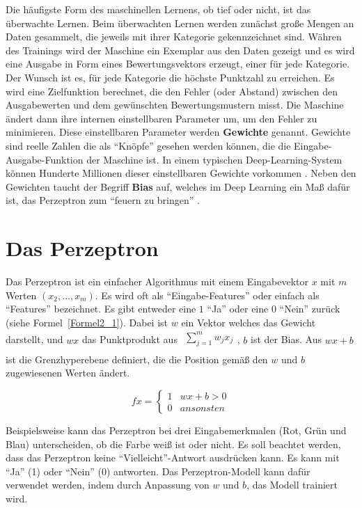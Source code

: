 Die häufigste Form des maschinellen Lernens, ob tief oder nicht, ist das überwachte Lernen. Beim überwachten Lernen werden zunächst große Mengen an Daten gesammelt, die jeweils mit ihrer Kategorie gekennzeichnet sind. Währen des Trainings wird der Maschine ein Exemplar aus den Daten gezeigt und es wird eine Ausgabe in Form eines Bewertungsvektors erzeugt, einer für jede Kategorie. Der Wunsch ist es, für jede Kategorie die höchste Punktzahl zu erreichen. Es wird eine Zielfunktion berechnet, die den Fehler (oder Abstand) zwischen den Ausgabewerten und dem gewünschten Bewertungsmustern misst. Die Maschine ändert dann ihre internen einstellbaren Parameter um, um den Fehler zu minimieren. Diese einstellbaren Parameter werden \textbf{Gewichte} genannt. Gewichte sind reelle Zahlen die als \enquote{Knöpfe} gesehen werden können, die die Eingabe-Ausgabe-Funktion der Maschine ist. In einem typischen Deep-Learning-System können Hunderte Millionen dieser einstellbaren Gewichte vorkommen \cite*{Lecun2015}. Neben den Gewichten taucht der Begriff \textbf{Bias} auf, welches im Deep Learning ein Maß dafür ist, das Perzeptron zum \enquote{feuern zu bringen} \cite*[7]{Nielsen2015}.


\section{Das Perzeptron}
Das Perzeptron ist ein einfacher Algorithmus mit einem Eingabevektor $x$ mit $m$ Werten $(x_2, ..., x_m)$. Es wird oft als \enquote{Eingabe-Features} oder einfach als \enquote{Features} bezeichnet. Es gibt entweder eine $1$ \enquote{Ja} oder eine $0$ \enquote{Nein} zurück (siehe Formel~\ref{Formel2_1}). Dabei ist $w$ ein Vektor welches das Gewicht darstellt, und $wx$ das Punktprodukt aus $\begin{array}{l}
        {\textstyle \sum ^{m}_{j=1}} w_{j} x_{j} \\
    \end{array}$, $b$ ist der Bias. Aus $wx + b$ ist die Grenzhyperebene definiert, die die Position gemäß den $w$ und $b$ zugewiesenen Werten ändert.

\begin{equation}
    fx=\begin{cases}
        1 & wx+b >0   \\
        0 & ansonsten
    \end{cases}
    \label{Formel2_1}
\end{equation}

Beispielsweise kann das Perzeptron bei drei Eingabemerkmalen  (Rot, Grün und Blau) unterscheiden, ob die Farbe weiß ist oder nicht. Es soll beachtet werden, dass das Perzeptron keine \enquote{Vielleicht}-Antwort ausdrücken kann. Es kann mit \enquote{Ja} (1) oder \enquote{Nein} (0) antworten. Das Perzeptron-Modell kann dafür verwendet werden, indem durch Anpassung von $w$ und $b$, das Modell trainiert wird.



